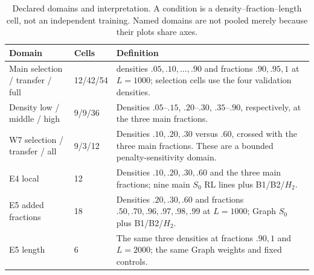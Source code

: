 \begin{table}[htbp]
\centering\small
\caption{Declared domains and interpretation. A condition is a density--fraction--length cell, not an independent training. Named domains are not pooled merely because their plots share axes.}
\label{tab:domains}
\begin{tabular}{>{\raggedright\arraybackslash}p{.25\linewidth}p{.12\linewidth}>{\raggedright\arraybackslash}p{.53\linewidth}}
\toprule
Domain & Cells & Definition\\
\midrule
Main selection / transfer / full &12/42/54 &18 densities $.05,.10,\ldots,.90$ and fractions $.90,.95,1$ at $L=1000$; selection cells use the four validation densities.\\
Density low / middle / high &9/9/36 &Densities $.05$--$.15$, $.20$--$.30$, $.35$--$.90$, respectively, at the three main fractions.\\
W7 selection / transfer / all &9/3/12 &Densities $.10,.20,.30$ versus $.60$, crossed with the three main fractions. These are a bounded penalty-sensitivity domain.\\
E4 local &12 &Densities $.10,.20,.30,.60$ and the three main fractions; nine main $S_0$ RL lines plus B1/B2/$H_2$.\\
E5 added fractions &18 &Densities $.20,.30,.60$ and fractions $.50,.70,.96,.97,.98,.99$ at $L=1000$; Graph $S_0$ plus B1/B2/$H_2$.\\
E5 length &6 &The same three densities at fractions $.90,1$ and $L=2000$; the same Graph weights and fixed controls.\\
\bottomrule
\end{tabular}
\end{table}
